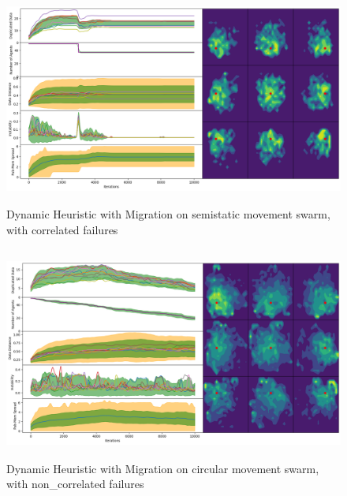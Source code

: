 \documentclass{UoYCSproject}
\begin{document}
\begin{figure}[htb]
\label{fig:static_movement_con3}
\begin{center}
\centering
\includegraphics[height=7cm]{"./Dynamic_Migration/Static_Move_con.png"}
\caption{Dynamic Heuristic with Migration on semi\-static movement swarm, with correlated failures}
\end{center}
\end{figure}

\begin{figure}[htb]
\label{fig:circle_movement_non3}
\begin{center}
\centering
\includegraphics[height=7cm]{"./Dynamic_Migration/Cicrle_Move_non.png"}
\caption{Dynamic Heuristic with Migration on circular movement swarm, with non\_correlated failures}
\end{center}
\end{figure}
\end{document}
